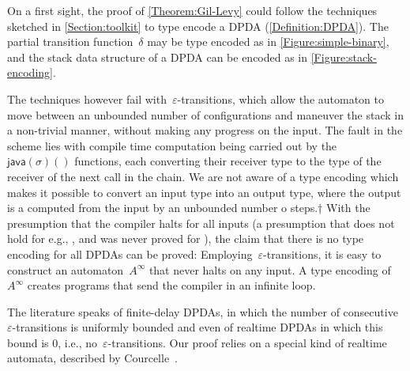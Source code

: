 On a first sight, the proof of \cref{Theorem:Gil-Levy} could follow the techniques
  sketched in \cref{Section:toolkit} to type encode a DPDA (\cref{Definition:DPDA}).
The partial transition function~$δ$ may be type encoded as in \cref{Figure:simple-binary},
and the stack data structure of a DPDA can be encoded as in \cref{Figure:stack-encoding}.

The techniques however fail with~$ε$-transitions,
  which allow the automaton to move between an unbounded number of
  configurations and maneuver the stack in a non-trivial manner,
  without making any progress on the input.
The fault in the scheme lies with compile time computation being carried out
  by the~$\textsf{java}(σ)()$ functions, each converting
  their receiver type to the type of the receiver of the next call in the chain.
We are not aware of a \Java type encoding which makes
  it possible to convert an input type into an output type, where
  the output is a computed from the input by an unbounded number o steps.†{%
    With the presumption that the \Java compiler halts for all inputs (a presumption that does
    not hold for e.g., \CC, and was never proved for \Java), the claim that there is no \Java type encoding for all DPDAs can be proved:
 Employing~$ε$-transitions, it is easy to construct an automaton~$A^∞$ that
  never halts on any input.
A type encoding of~$A^∞$ creates programs that send the compiler in an infinite loop.
}

The literature speaks of finite-delay DPDAs, in which the number
  of consecutive~$ε$-transitions is uniformly bounded and even of
  realtime DPDAs in which this bound is 0, i.e., no~$ε$-transitions.
Our proof relies on a special kind of realtime automata,
  described by Courcelle~\cite{Courcelle:77}.


